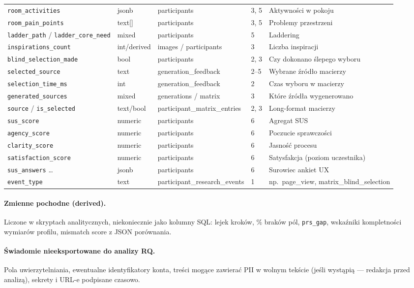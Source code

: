 \begin{longtable}{@{}p{3.6cm}p{1.8cm}p{2.4cm}p{1.4cm}p{3.2cm}@{}}
  \addlinespace
  \texttt{room\_activities} & jsonb & participants & 3, 5 & Aktywności w pokoju \\
  \texttt{room\_pain\_points} & text[] & participants & 3, 5 & Problemy przestrzeni \\
  \texttt{ladder\_path} / \texttt{ladder\_core\_need} & mixed & participants & 5 & Laddering \\
  \texttt{inspirations\_count} & int/derived & images / participants & 3 & Liczba inspiracji \\
  \addlinespace
  \texttt{blind\_selection\_made} & bool & participants & 2, 3 & Czy dokonano ślepego wyboru \\
  \texttt{selected\_source} & text & generation\_feedback & 2--5 & Wybrane źródło macierzy \\
  \texttt{selection\_time\_ms} & int & generation\_feedback & 2 & Czas wyboru w macierzy \\
  \texttt{generated\_sources} & mixed & generations / matrix & 3 & Które źródła wygenerowano \\
  \texttt{source} / \texttt{is\_selected} & text/bool & participant\_matrix\_entries & 2, 3 & Long-format macierzy \\
  \addlinespace
  \texttt{sus\_score} & numeric & participants & 6 & Agregat SUS \\
  \texttt{agency\_score} & numeric & participants & 6 & Poczucie sprawczości \\
  \texttt{clarity\_score} & numeric & participants & 6 & Jasność procesu \\
  \texttt{satisfaction\_score} & numeric & participants & 6 & Satysfakcja (poziom uczestnika) \\
  \texttt{sus\_answers} \ldots & jsonb & participants & 6 & Surowiec ankiet UX \\
  \addlinespace
  \texttt{event\_type} & text & participant\_research\_events & 1 & np.\ page\_view, matrix\_blind\_selection \\
\end{longtable}

\paragraph{Zmienne pochodne (derived).}
Liczone w skryptach analitycznych, niekoniecznie jako kolumny SQL: lejek kroków, \% braków pól, \texttt{prs\_gap}, wskaźniki kompletności wymiarów profilu, mismatch score z JSON porównania.

\paragraph{Świadomie nieeksportowane do analizy RQ.}
Pola uwierzytelniania, ewentualne identyfikatory konta, treści mogące zawierać PII w wolnym tekście (jeśli wystąpią --- redakcja przed analizą), sekrety i URL-e podpisane czasowo.

